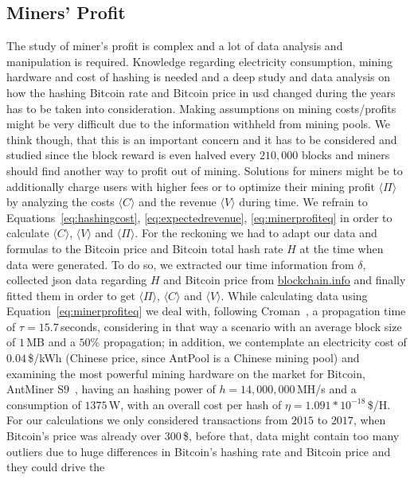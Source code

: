 \documentclass[USenglish]{uit-thesis}
\begin{document}
\subsection{Miners' Profit}
\label{sec:minersprofit}
The study of miner's profit is complex and a lot of
data analysis and manipulation is required. Knowledge
regarding electricity consumption, mining hardware and
cost of hashing is needed and a deep study and data analysis
on how the hashing Bitcoin rate and Bitcoin price in \gls{usd}
changed during the years has to be taken into consideration.
Making assumptions on mining costs/profits might be
very difficult due to the information withheld from mining pools.
We think though, that this is an important concern and it has
to be considered and studied since the block reward is even
halved every $210,000$ blocks and miners should find another
way to profit out of mining. Solutions for miners might be to
additionally charge users with higher fees or to optimize
their mining profit $\langle \Pi \rangle$ by analyzing
the costs $\langle C \rangle$ and the revenue $\langle V \rangle$
during time. We refrain to Equations~\ref{eq:hashingcost}, \ref{eq:expectedrevenue},
\ref{eq:minerprofiteq} in order to calculate
$\langle C \rangle$, $\langle V \rangle$ and $\langle \Pi \rangle$.
For the reckoning
we had to adapt our data and formulas to the
Bitcoin price and Bitcoin total hash rate $H$ at the time
when data were generated. To do so, we extracted our
time information from $\delta$, collected \gls{json} data
regarding $H$ and Bitcoin price from \url{blockchain.info}
and finally fitted them in order to get $\langle \Pi \rangle$,
$\langle C \rangle$ and $\langle V \rangle$.
While calculating data using Equation~\ref{eq:minerprofiteq}
we deal with, following Croman~\cite{croman2016},
a propagation time of $\tau = 15.7$\,seconds,
considering in that way a scenario with
an average block size of $1$\,MB and
a $50$\% propagation; in addition, we contemplate
an electricity cost of $0.04$\,\$/kWh (Chinese price, since
AntPool is a Chinese mining pool) and
examining the most powerful
mining hardware on the market for Bitcoin,
AntMiner S$9$~\cite{antminerS9}, having an hashing power
of $h = 14,000,000$\,MH/s and a consumption
of $1375$\,W, with an overall cost per hash of
$\eta = 1.091 * 10^{-18}$\,\$/H.
For our calculations we only considered transactions from
$2015$ to $2017$, when Bitcoin's price was already over
$300$\,\$, before that, data might contain too many
outliers due to huge differences in Bitcoin's hashing
rate and Bitcoin price and they could drive the
\end{document}
